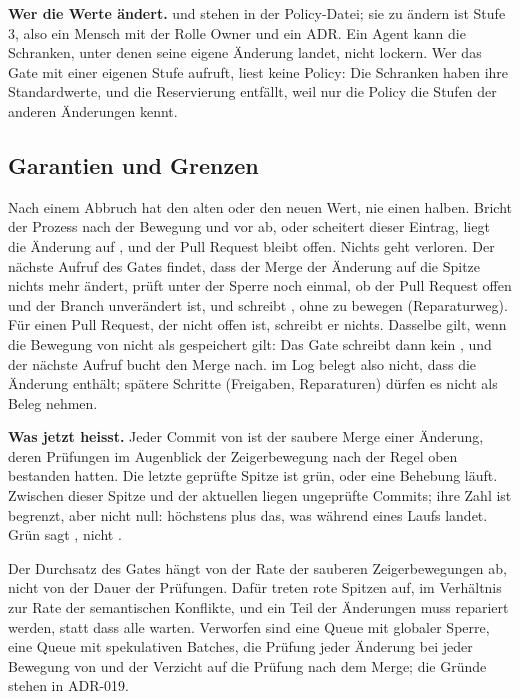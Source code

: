 {\bf Wer die Werte ändert.}
 und  stehen in der Policy-Datei; sie zu ändern ist Stufe 3,
also ein Mensch mit der Rolle Owner und ein ADR.
Ein Agent kann die Schranken, unter denen seine eigene Änderung landet, nicht lockern.
Wer das Gate mit einer eigenen Stufe aufruft, liest keine Policy: Die Schranken haben ihre
Standardwerte, und die Reservierung entfällt, weil nur die Policy die Stufen der anderen
Änderungen kennt.

\subsection{Garantien und Grenzen}

Nach einem Abbruch hat  den alten oder den neuen Wert, nie einen halben.
Bricht der Prozess nach der Bewegung und vor  ab, oder scheitert dieser Eintrag,
liegt die Änderung auf , und der Pull Request bleibt offen.
Nichts geht verloren.
Der nächste Aufruf des Gates findet, dass der Merge der Änderung auf die Spitze nichts mehr
ändert, prüft unter der Sperre noch einmal, ob der Pull Request offen und der Branch unverändert
ist, und schreibt , ohne  zu bewegen (Reparaturweg).
Für einen Pull Request, der nicht offen ist, schreibt er nichts.
Dasselbe gilt, wenn die Bewegung von  nicht als gespeichert gilt: Das Gate schreibt
dann kein , und der nächste Aufruf bucht den Merge nach.
 im Log belegt also nicht, dass  die Änderung enthält; spätere Schritte
(Freigaben, Reparaturen) dürfen es nicht als Beleg nehmen.

\startinfobox
{\bf Was  jetzt heisst.}
Jeder Commit von  ist der saubere Merge einer Änderung, deren Prüfungen im Augenblick
der Zeigerbewegung nach der Regel oben bestanden hatten.
Die letzte geprüfte Spitze ist grün, oder eine Behebung läuft.
Zwischen dieser Spitze und der aktuellen liegen ungeprüfte Commits;
ihre Zahl ist begrenzt, aber nicht null: höchstens  plus das, was während
eines Laufs landet.
Grün sagt , nicht .
\stopinfobox

Der Durchsatz des Gates hängt von der Rate der sauberen Zeigerbewegungen ab,
nicht von der Dauer der Prüfungen.
Dafür treten rote Spitzen auf, im Verhältnis zur Rate der semantischen Konflikte, und ein Teil der
Änderungen muss repariert werden, statt dass alle warten.
Verworfen sind eine Queue mit globaler Sperre, eine Queue mit spekulativen Batches, die Prüfung
jeder Änderung bei jeder Bewegung von  und der Verzicht auf die Prüfung nach dem Merge;
die Gründe stehen in ADR-019.

